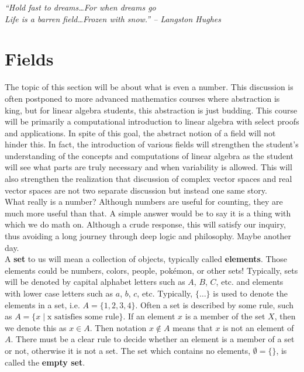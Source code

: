 \begin{center} 
\emph{``Hold fast to dreams\ldots For when dreams go\\ Life is a barren field\ldots Frozen with snow.'' -- Langston Hughes}
\end{center}

\section{Fields}\label{sec:fields}
The topic of this section will be about what is even a number. This discussion is often postponed to more advanced mathematics courses where abstraction is king, but for linear algebra students, this abstraction is just budding. This course will be primarily a computational introduction to linear algebra with select proofs and applications. In spite of this goal, the abstract notion of a field will not hinder this. In fact, the introduction of various fields will strengthen the student's understanding of the concepts and computations of linear algebra as the student will see what parts are truly necessary and when variability is allowed. This will also strengthen the realization that discussion of complex vector spaces and real vector spaces are not two separate discussion but instead one same story.\\

What really is a number? Although numbers are useful for counting, they are much more useful than that.  A simple answer would be to say it is a thing with which we do math on. Although a crude response, this will satisfy our inquiry, thus avoiding a long journey through deep logic and philosophy. Maybe another day.\\

A \textbf{set} to us will mean a collection of objects, typically called \textbf{elements}. Those elements could be numbers, colors, people, pok\'{e}mon, or other sets! Typically, sets will be denoted by capital alphabet letters such as $A$, $B$, $C$, etc. and elements with lower case letters such as $a$, $b$, $c$, etc. Typically, $\{\ldots\}$ is used to denote the elements in a set, i.e. $A=\{1, 2, 3, 4\}$. Often a set is described by some rule, such as $A = \{x\mid \text{x satisfies some rule}\}$. If an element $x$ is a member of the set $X$, then we denote this as $x\in A$. Then notation $x\notin A$ means that $x$ is not an element of $A$. There must be a clear rule to decide whether an element is a member of a set or not, otherwise it is not a set. The set which contains no elements, $\emptyset = \{\}$, is called the \textbf{empty set}.\\

